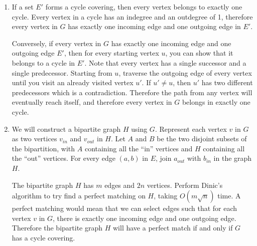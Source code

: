 \documentclass{article}
\begin{document}
\begin{solution}
\begin{enumerate}[label = (\alph*)]
    \item If a set $E'$ forms a cycle covering, then every vertex belongs to exactly one cycle. 
    Every vertex in a cycle has an indegree and an outdegree of 1, 
    therefore every vertex in $G$ has exactly one incoming edge and one outgoing edge in $E'$.

    Conversely, if every vertex in $G$ has exactly one incoming edge and one outgoing edge $E'$, 
    then for every starting vertex $u$, you can show that it belongs to a cycle in $E'$.
    Note that every vertex has a single successor and a single predecessor.
    Starting from $u$, traverse the outgoing edge of every vertex until you visit an already visited vertex $u'$.
    If $u' \neq u$, then $u'$ has two different predecessors which is a contradiction.
    Therefore the path from any vertex will eventually reach itself, and therefore every vertex in $G$
    belongs in exactly one cycle.
    

    \item We will construct a bipartite graph $H$ using $G$.
    Represent each vertex $v$ in $G$ as two vertices $v_{in}$ and $v_{out}$ in $H$.
    Let $A$ and $B$ be the two disjoint subsets of the bipartition, 
    with $A$ containing all the ``in'' vertices and $H$ containing all the ``out'' vertices.
    For every edge $(a, b)$ in $E$, join $a_{out}$ with $b_{in}$ in the graph $H$.

    The bipartite graph $H$ has $m$ edges and $2n$ vertices. 
    Perform Dinic's algorithm to try find a perfect matching on $H$, taking $O(m\sqrt{n})$ time.
    A perfect matching would mean that we can select edges such that for each vertex $v$ in $G$,
    there is exactly one incoming edge and one outgoing edge. 
    Therefore the bipartite graph $H$ will have a perfect match if and only if $G$ has a cycle covering.




\end{enumerate}
\end{solution}
\end{document}
